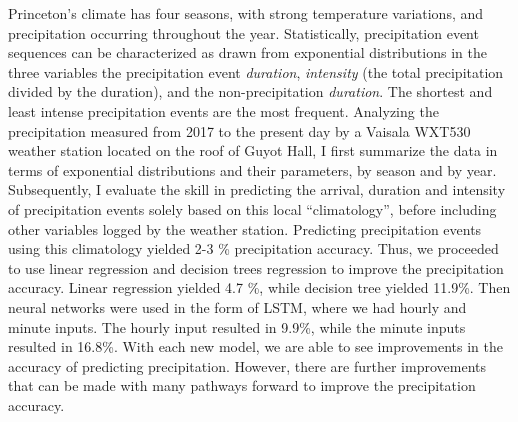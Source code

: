 

Princeton's climate has four seasons, with strong temperature
variations, and precipitation occurring throughout the
year. Statistically, precipitation event sequences can be
characterized as drawn from exponential distributions in the three
variables the precipitation event \textit{duration}, \textit{intensity} 
(the total precipitation divided by the duration), and the non-precipitation 
\textit{duration}. The shortest and least intense precipitation events 
are the most frequent. Analyzing the precipitation measured from 2017 
to the present day by a Vaisala WXT530 weather station located on the 
roof of Guyot Hall, I first summarize the data in terms
of exponential distributions and their parameters, by season and by
year. Subsequently, I evaluate the skill in predicting the arrival,
duration and intensity of precipitation events solely based on this
local ``climatology'', before including other variables logged by the
weather station. Predicting precipitation events using this climatology
yielded 2-3 \% precipitation accuracy. Thus, we proceeded to use linear
regression and decision trees regression to improve the precipitation
accuracy. Linear regression yielded 4.7 \%, while decision tree yielded 
11.9\%. Then neural networks were used in the form of LSTM, where we had 
hourly and minute inputs. The hourly input
resulted in 9.9\%, while the minute inputs resulted in 16.8\%. With each new model, 
we are able to see improvements in the accuracy of
predicting precipitation. However, there are further improvements that can be 
made with many pathways forward to improve the precipitation accuracy.  
